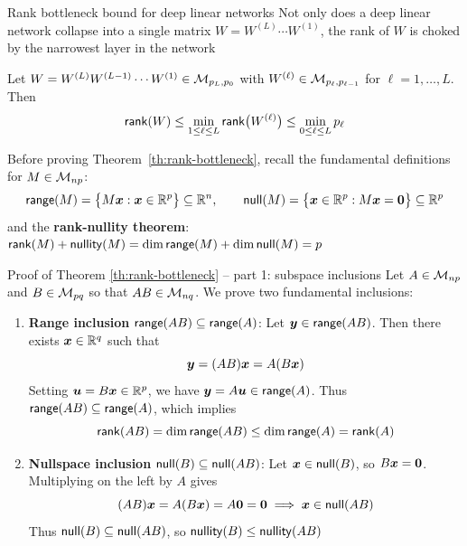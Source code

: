 \documentclass[aspectratio=169]{beamer}\usepackage[]{graphicx}\usepackage[]{xcolor}
\begin{document}
\begin{frame}{Rank bottleneck bound for deep linear networks}
Not only does a deep linear network collapse into a single matrix $W = W^{(L)} \cdots W^{(1)}$, the rank of $W$ is choked by the narrowest layer in the network
\vfill
\begin{importanttheorem}
\label{th:rank-bottleneck}
Let $W = W^{(L)} W^{(L-1)} \cdots W^{(1)} \in \mathcal{M}_{p_L, p_0}$ with $W^{(\ell)} \in \mathcal{M}_{p_\ell, p_{\ell-1}}$ for $\ell = 1, \ldots, L$. Then
\[
\mathsf{rank}(W) \le \min_{1 \le \ell \le L} \mathsf{rank}\big(W^{(\ell)}\big) \le \min_{0 \le \ell \le L} p_\ell
\]
\end{importanttheorem}
\vfill
Before proving Theorem~\ref{th:rank-bottleneck}, recall the fundamental definitions for $M \in \mathcal{M}_{np}$:
\[
\range(M) = \big\{ M\bx : \bx \in \IR^p \big\} \subseteq \IR^n, \qquad
\nullspace(M) = \big\{ \bx \in \IR^p : M\bx = \b0 \big\} \subseteq \IR^p
\]
and the \textbf{rank-nullity theorem}: $\mathsf{rank}(M) + \mathsf{nullity}(M) = \dim\mathsf{range}(M) + \dim\mathsf{null}(M) = p$
\end{frame}


\begin{frame}[importantcolour]{Proof of Theorem \ref{th:rank-bottleneck} -- part 1: subspace inclusions}
Let $A \in \mathcal{M}_{np}$ and $B \in \mathcal{M}_{pq}$ so that $AB \in \mathcal{M}_{nq}$. We prove two fundamental inclusions:
\vfill
\begin{enumerate}
\item \textbf{Range inclusion} $\mathsf{range}(AB) \subseteq \mathsf{range}(A)$:
Let $\bm{y} \in \mathsf{range}(AB)$. Then there exists $\bm{x} \in \mathbb{R}^q$ such that
\[
\bm{y} = (AB)\bm{x} = A(B\bm{x})
\]
Setting $\bm{u} = B\bm{x} \in \mathbb{R}^p$, we have $\bm{y} = A\bm{u} \in \mathsf{range}(A)$. Thus $\mathsf{range}(AB) \subseteq \mathsf{range}(A)$, which implies
\[
\mathsf{rank}(AB) = \dim\mathsf{range}(AB) \le \dim\mathsf{range}(A) = \mathsf{rank}(A)
\]
\vfill
\item \textbf{Nullspace inclusion} $\mathsf{null}(B) \subseteq \mathsf{null}(AB)$:
Let $\bm{x} \in \mathsf{null}(B)$, so $B\bx = \b0$. Multiplying on the left by $A$ gives
\[
(AB)\bx = A(B\bx) = A\b0 = \b0 \implies \bx \in \nullspace(AB)
\]
Thus $\mathsf{null}(B) \subseteq \mathsf{null}(AB)$, so $\mathsf{nullity}(B) \le \mathsf{nullity}(AB)$
\end{enumerate}
\end{frame}
\end{document}
